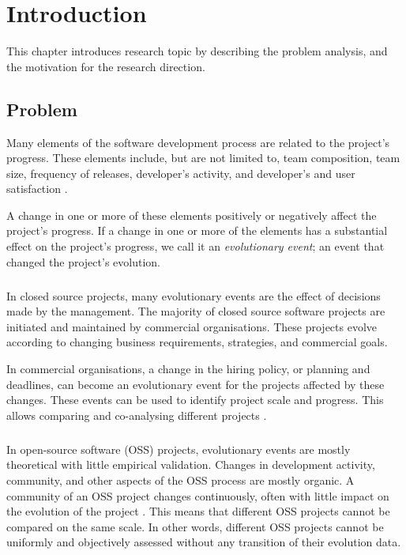 \chapter{Introduction}
\label{introduction}

This chapter introduces research topic by describing the problem analysis, and
the motivation for the research direction.

\section{Problem}
Many elements of the software development process are related to the project's
progress. These elements include, but are not limited to, team composition,
team size, frequency of releases, developer's activity, and developer's and
user satisfaction \cite{crowston2006, delone1992, samoladas2010}.

A change in one or more of these elements positively or negatively affect the
project's progress. If a change in one or more of the elements has a substantial
effect on the project's progress, we call it an \emph{evolutionary event}\rm; an
event that changed the project's evolution.

\paragraph{}
In closed source projects, many evolutionary events are the effect of decisions
made by the management. The majority of closed source software projects are
initiated and maintained by commercial organisations. These projects evolve
according to changing business requirements, strategies, and commercial goals.

In commercial organisations, a change in the hiring policy, or planning and
deadlines, can become an evolutionary event for the projects affected by these
changes. These events can be used to identify project scale and progress. This
allows comparing and co-analysing different projects \cite{karus2013}.

\paragraph{}
In open-source software (OSS) projects, evolutionary events are mostly
theoretical with little empirical validation. Changes in development activity,
community, and other aspects of the OSS process are mostly organic. A community
of an OSS project changes continuously, often with little impact on the
evolution of the project \cite{androutsellis}. This means that different OSS
projects cannot be compared on the same scale. In other words, different OSS
projects cannot be uniformly and objectively assessed without any transition of
their evolution data.

